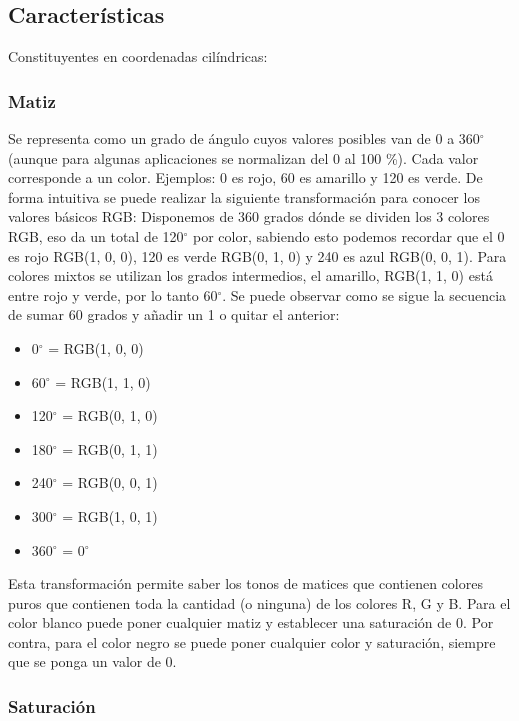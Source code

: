 \subsection{Características}

Constituyentes en coordenadas cilíndricas:\\

\subsubsection{Matiz}

Se representa como un grado de ángulo cuyos valores posibles van de 0 a 360$^\circ$ (aunque para algunas aplicaciones se normalizan del 0 al 100 \%). Cada valor corresponde a un color. Ejemplos: 0 es rojo, 60 es amarillo y 120 es verde.
De forma intuitiva se puede realizar la siguiente transformación para conocer los valores básicos RGB:
Disponemos de 360 grados dónde se dividen los 3 colores RGB, eso da un total de 120$^\circ$ por color, sabiendo esto podemos recordar que el 0 es rojo RGB(1, 0, 0), 120 es verde RGB(0, 1, 0) y 240 es azul RGB(0, 0, 1). Para colores mixtos se utilizan los grados intermedios, el amarillo, RGB(1, 1, 0) está entre rojo y verde, por lo tanto 60$^\circ$. Se puede observar como se sigue la secuencia de sumar 60 grados y añadir un 1 o quitar el anterior:\\

\begin{itemize}
\item 0$^\circ$ = RGB(1, 0, 0)
\item 60$^{\circ}$ = RGB(1, 1, 0)
\item 120$^{\circ}$ = RGB(0, 1, 0)
\item 180$^{\circ}$ = RGB(0, 1, 1)
\item 240$^{\circ}$ = RGB(0, 0, 1)
\item 300$^{\circ}$ = RGB(1, 0, 1)
\item 360$^{\circ}$ = 0$^{\circ}$
\end{itemize}

Esta transformación permite saber los tonos de matices que contienen colores puros que contienen toda la cantidad (o ninguna) de los colores R, G y B. Para el color blanco puede poner cualquier matiz y establecer una saturación de 0. Por contra, para el color negro se puede poner cualquier color y saturación, siempre que se ponga un valor de 0.

\subsubsection{Saturación}

